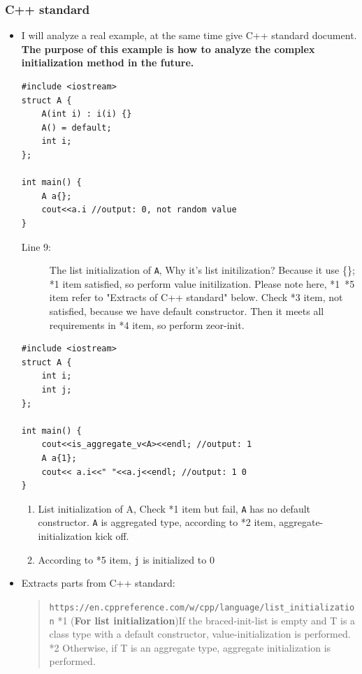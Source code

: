 \documentclass[a4paper,11pt,twoside]{book}
\begin{document}
\subsubsection{C++ standard}
\begin{itemize}
	
	

	\item I will analyze a real example, at the same time give C++ standard document. \textbf{The purpose of this example is how to analyze the complex initialization method in the future.}
\begin{lstlisting}
#include <iostream>
struct A {
	A(int i) : i(i) {}
	A() = default;
	int i;
};
		
int main() {
	A a{};
	cout<<a.i //output: 0, not random value
}
\end{lstlisting}
	
	\begin{description}
		\item[Line 9:]  The list initialization of \texttt{A}, Why it's list initilization? Because it use \{\}; *1 item satisfied, so perform value initilization. Please note here, *1~*5 item refer to "Extracts of C++ standard" below. Check *3 item, not satisfied, because we have default constructor. Then it meets all requirements in *4 item, so perform zeor-init.
	\end{description}
	
	
\begin{lstlisting}
#include <iostream>
struct A {
	int i;
	int j;
};
	
int main() {
	cout<<is_aggregate_v<A><<endl; //output: 1
    A a{1};
	cout<< a.i<<" "<<a.j<<endl; //output: 1 0
}
\end{lstlisting}
	
	\begin{enumerate}
		\item List initialization of A, Check *1 item but fail, \texttt{A} has no default constructor. \texttt{A} is aggregated type, according to *2 item, aggregate-initialization kick off.
		
		\item According to *5 item, \texttt{j} is initialized to 0		
	\end{enumerate}
	
	
	\item  Extracts parts from C++ standard: 
	
	\begin{quote}
		\verb|https://en.cppreference.com/w/cpp/language/list_initialization| \newline
		*1 (\textbf{For list initialization})If the braced-init-list is empty and T is a class type with a default constructor, value-initialization is performed. 
		\newline
		*2 Otherwise, if T is an aggregate type, aggregate initialization is performed.
		\newline
		

\end{quote}
\end{itemize}
\end{document}
